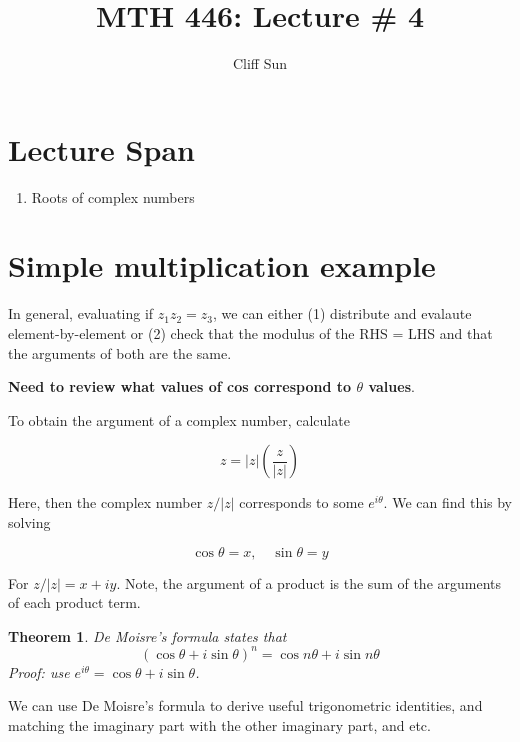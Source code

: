 \documentclass{article}
\title{MTH 446: Lecture \# 4}
\author{Cliff Sun}
\newtheorem{theorem}{Theorem}[section]
\newtheorem{one minute paper}[theorem]{One Minute Paper}
\begin{document}
\maketitle

\section*{Lecture Span}
\begin{enumerate}
    \item Roots of complex numbers
\end{enumerate}

\section*{Simple multiplication example}

In general, evaluating if $z_1z_2 = z_3$, we can either (1) distribute and evalaute element-by-element or (2) check that the modulus of the RHS = LHS and that the arguments of both are the same.

\textbf{Need to review what values of cos correspond to $\theta$ values}. 

To obtain the argument of a complex number, calculate 

\begin{equation}
    z = |z|\left( \frac{z}{|z|} \right)
\end{equation}

Here, then the complex number $z/|z|$ corresponds to some $e^{i\theta}$. We can find this by solving 

\begin{equation}
    \cos\theta = x, \quad \sin\theta = y
\end{equation}

For $z/|z| = x + iy$. Note, the argument of a product is the sum of the arguments of each product term. 

\begin{theorem}
    De Moisre's formula states that 
    \begin{equation}
        (\cos\theta + i\sin\theta)^n = \cos n\theta + i\sin n\theta
    \end{equation}
    Proof: use $e^{i\theta} = \cos\theta + i\sin\theta$. 
\end{theorem}

We can use De Moisre's formula to derive useful trigonometric identities, and matching the imaginary part with the other imaginary part, and etc. 
\end{document}
